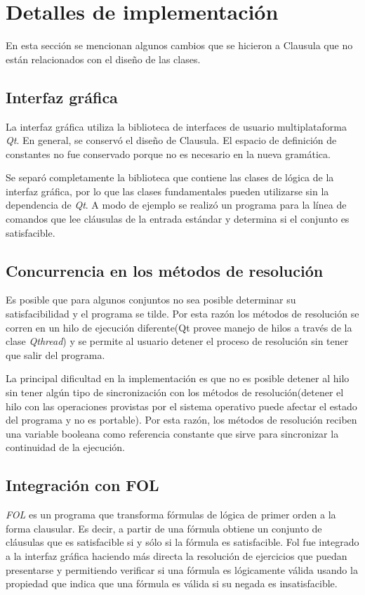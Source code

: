 \documentclass[a4paper,12pt]{article}
\begin{document}
\section{Detalles de implementación}
En esta sección se mencionan algunos cambios que se hicieron a Clausula
que no están relacionados con el diseño de las clases.
\subsection{Interfaz gráfica}
La interfaz gráfica utiliza la biblioteca de interfaces de usuario multiplataforma \emph{Qt}.
En general, se conservó el diseño de Clausula. El espacio de definición de constantes no fue
conservado porque no es necesario en la nueva gramática.

Se separó completamente la biblioteca que contiene las clases de lógica de la interfaz gráfica,
por lo que las clases fundamentales pueden utilizarse sin la dependencia de \emph{Qt}. A modo
de ejemplo se realizó un programa para la línea de comandos que lee cláusulas de la entrada
estándar y determina si el conjunto es satisfacible.
\subsection{Concurrencia en los métodos de resolución}
Es posible que para algunos conjuntos no sea posible determinar su satisfacibilidad y el programa
se tilde. Por esta razón los métodos de resolución se corren en un hilo de ejecución diferente(Qt provee manejo de hilos a través de
la clase \emph{Qthread}) y se permite al usuario detener el proceso de resolución sin tener que salir
del programa. 

La principal dificultad en la implementación es que no es posible detener al hilo sin tener algún tipo de sincronización
con los métodos de resolución(detener el hilo con las operaciones provistas por el sistema operativo puede afectar el estado del programa
y no es portable). Por esta razón, los métodos de resolución reciben una variable booleana como referencia constante que sirve para sincronizar
la continuidad de la ejecución.
\subsection{Integración con FOL}
\emph{FOL}\cite{fol} es un programa que transforma fórmulas de lógica de primer orden a la forma clausular. Es decir,
a partir de una fórmula obtiene un conjunto de cláusulas que es satisfacible si y sólo si la fórmula es satisfacible.
Fol fue integrado a la interfaz gráfica haciendo más directa la resolución de ejercicios que puedan presentarse y permitiendo
verificar si una fórmula es lógicamente válida usando la propiedad que indica que una fórmula es válida si su negada
es insatisfacible.
\end{document}
